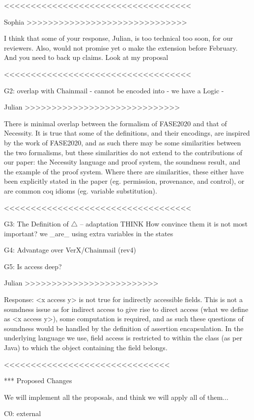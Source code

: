 <<<<<<<<<<<<<<<<<<<<<<<<<<<<<<<<<<<

Sophia >>>>>>>>>>>>>>>>>>>>>>>>>>>>>>

I think that some of your response, Julian, is too technical too soon, for our reviewers. Also, would not promise yet o make the extension before February. And you need to back up claims. Look at my proposal

<<<<<<<<<<<<<<<<<<<<<<<<<<<<<<<<<<<

G2:  overlap with Chainmail
- cannot be encoded into
- we have a Logic
- %

Julian >>>>>>>>>>>>>>>>>>>>>>>>>>>>>

There is minimal overlap between the formalism of FASE2020 and that of Necessity. It is true that some of the definitions, and their encodings, are inspired by the work of FASE2020, 
and as such there may be some similarities between the two formalisms, but these similarities do not extend to the contributions of our paper: the Necessity language and proof system, 
the soundness result, and the example of the proof system. Where there are similarities, these either have been explicitly stated in the paper (eg. permission, provenance, and control),
or are common coq idioms (eg. variable substitution).

<<<<<<<<<<<<<<<<<<<<<<<<<<<<<<<<<<<

G3: The Definition of $\triangle$ -- adaptation
THINK
How convince them it is not most important?
we _are_ using extra variables in the states

G4: Advantage over VerX/Chainmail (rev4)

G5: Is access deep?

Julian >>>>>>>>>>>>>>>>>>>>>>>>>

Response: <x access y> is not true for indirectly accessible fields. This is not a soundness issue as for indirect access to give rise to direct access (what we define as <x access y>), some computation is required, and as such these questions of soundness would be handled by the definition of assertion encapsulation. In the underlying language we use, field access is restricted to within the class (as per Java) to which the object containing the field belongs.

<<<<<<<<<<<<<<<<<<<<<<<<<<<<<<<


*** Proposed Changes

We will implement all the proposals, and think we will apply all of them...

C0: external

